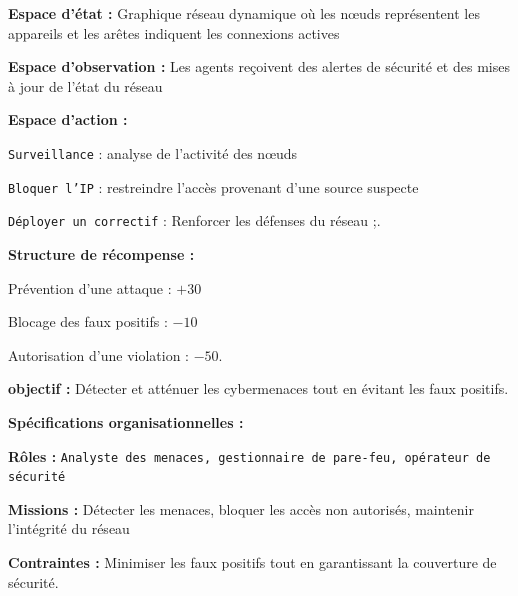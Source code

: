 \begin{enumerate*}[label={\roman*)}, itemjoin={; \quad}]
    \item \textbf{Espace d'état :} Graphique réseau dynamique où les nœuds représentent les appareils et les arêtes indiquent les connexions actives
    \item \textbf{Espace d'observation :} Les agents reçoivent des alertes de sécurité et des mises à jour de l'état du réseau
    \item \textbf{Espace d'action :}
    \begin{enumerate*}[label={\roman*)}, itemjoin={; \quad}]
        \item \texttt{Surveillance} : analyse de l'activité des nœuds
        \item \texttt{Bloquer l'IP} : restreindre l'accès provenant d'une source suspecte
        \item \texttt{Déployer un correctif} : Renforcer les défenses du réseau ;.
    \end{enumerate*}
    \item \textbf{Structure de récompense :}
    \begin{enumerate*}[label={\roman*)}, itemjoin={; \quad}]
        \item Prévention d'une attaque : $+30$
        \item Blocage des faux positifs : $-10$
        \item Autorisation d'une violation : $-50$.
    \end{enumerate*}
    \item \textbf{objectif :} Détecter et atténuer les cybermenaces tout en évitant les faux positifs.
\end{enumerate*}
%
\textbf{Spécifications organisationnelles :}
\begin{enumerate*}[label={\roman*)}, itemjoin={; \quad}]
    \item \textbf{Rôles :} \texttt{Analyste des menaces, gestionnaire de pare-feu, opérateur de sécurité}
    \item \textbf{Missions :} Détecter les menaces, bloquer les accès non autorisés, maintenir l'intégrité du réseau
    \item \textbf{Contraintes :} Minimiser les faux positifs tout en garantissant la couverture de sécurité.
\end{enumerate*}

